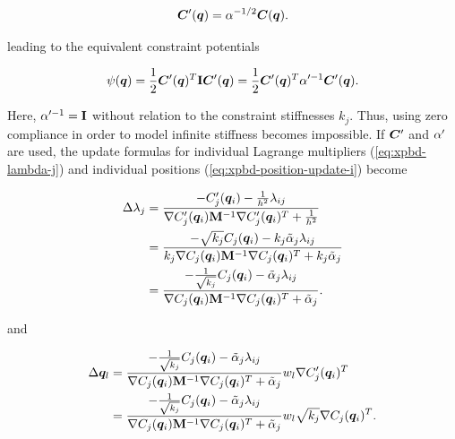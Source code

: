 \begin{equation}\label{eq:xpbd-alt-constraint}
    \bm{C}^{\prime}(\bm{q}) = \mathbf{\alpha}^{-1/2}\bm{C}(\bm{q}).
\end{equation}

\noindent leading to the equivalent constraint potentials

\begin{equation}\label{eq:xpbd-potential-2}
    \psi(\bm{q}) = \frac{1}{2} \bm{C}^{\prime}(\bm{q})^T \mathbf{I} \bm{C}^{\prime}(\bm{q}) 
    = \frac{1}{2} \bm{C}^{\prime}(\bm{q})^T \mathbf{\alpha}^{\prime -1} \bm{C}^{\prime}(\bm{q}).
\end{equation}  

\noindent Here, $\mathbf{\alpha}^{\prime -1} = \mathbf{I}$ without relation to the constraint stiffnesses $k_j$. Thus, using zero compliance in 
order to model infinite stiffness becomes impossible.  If $\bm{C}^{\prime}$ and 
$\mathbf{\alpha}^{\prime}$ are used, the update formulas for individual Lagrange multipliers (\cref{eq:xpbd-lambda-j}) and individual 
positions (\cref{eq:xpbd-position-update-i}) become

\begin{equation}\label{eq:xpbd-lambda-j-2}
    \begin{split}
    \Delta \lambda_j 
    &= \frac{-C^{\prime}_j(\bm{q}_i) - \frac{1}{h^2}\lambda_{ij}}{\nabla C^{\prime}_j(\bm{q}_i)\mathbf{M}^{-1} \nabla C^{\prime}_j(\bm{q}_i)^T + \frac{1}{h^2}} \\
    &= \frac{-\sqrt{k_j}C_j(\bm{q}_i) - k_j \tilde{\alpha}_j \lambda_{ij}}{k_j \nabla C_j(\bm{q}_i)\mathbf{M}^{-1} \nabla C_j(\bm{q}_i)^T + k_j \tilde{\alpha}_j} \\
    &= \frac{-\frac{1}{\sqrt{k_j}}C_j(\bm{q}_i) - \tilde{\alpha}_j \lambda_{ij}}{\nabla C_j(\bm{q}_i)\mathbf{M}^{-1} \nabla C_j(\bm{q}_i)^T + \tilde{\alpha}_j}.
    \end{split}
\end{equation}

\noindent and 

\begin{equation}\label{eq:xpbd-position-update-i-2}
    \begin{split}
    \Delta \bm{q}_l
    &= \frac{-\frac{1}{\sqrt{k_j}}C_j(\bm{q}_i) - \tilde{\alpha}_j \lambda_{ij}}{\nabla C_j(\bm{q}_i)\mathbf{M}^{-1} \nabla C_j(\bm{q}_i)^T + \tilde{\alpha}_j}
    w_l \nabla C^{\prime}_j(\bm{q}_i)^T \\
    &= \frac{-\frac{1}{\sqrt{k_j}}C_j(\bm{q}_i) - \tilde{\alpha}_j \lambda_{ij}}{\nabla C_j(\bm{q}_i)\mathbf{M}^{-1} \nabla C_j(\bm{q}_i)^T + \tilde{\alpha}_j}
    w_l \sqrt{k_j} \nabla C_j(\bm{q}_i)^T.
    \end{split}
\end{equation}

